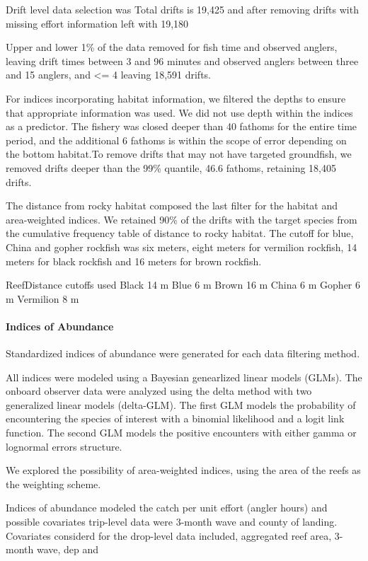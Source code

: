 \documentclass[preprint, 3p,
authoryear]{elsarticle} %
\begin{document}
Drift level data selection was Total drifts is 19,425 and after removing
drifts with missing effort information left with 19,180

Upper and lower 1\% of the data removed for fish time and observed
anglers, leaving drift times between 3 and 96 minutes and observed
anglers between three and 15 anglers, and \textless= 4 leaving 18,591
drifts.

For indices incorporating habitat information, we filtered the depths to
ensure that appropriate information was used. We did not use depth
within the indices as a predictor. The fishery was closed deeper than 40
fathoms for the entire time period, and the additional 6 fathoms is
within the scope of error depending on the bottom habitat.To remove
drifts that may not have targeted groundfish, we removed drifts deeper
than the 99\% quantile, 46.6 fathoms, retaining 18,405 drifts.

The distance from rocky habitat composed the last filter for the habitat
and area-weighted indices. We retained 90\% of the drifts with the
target species from the cumulative frequency table of distance to rocky
habitat. The cutoff for blue, China and gopher rockfish was six meters,
eight meters for vermilion rockfish, 14 meters for black rockfish and 16
meters for brown rockfish.

ReefDistance cutoffs used Black 14 m Blue 6 m Brown 16 m China 6 m
Gopher 6 m Vermilion 8 m

\hypertarget{indices-of-abundance}{%
\paragraph{Indices of Abundance}\label{indices-of-abundance}}

Standardized indices of abundance were generated for each data filtering
method.

All indices were modeled using a Bayesian genearlized linear models
(GLMs). The onboard observer data were analyzed using the delta method
with two generalized linear models (delta-GLM). The first GLM models the
probability of encountering the species of interest with a binomial
likelihood and a logit link function. The second GLM models the positive
encounters with either gamma or lognormal errors structure.

We explored the possibility of area-weighted indices, using the area of
the reefs as the weighting scheme.

Indices of abundance modeled the catch per unit effort (angler hours)
and possible covariates trip-level data were 3-month wave and county of
landing. Covariates considerd for the drop-level data included,
aggregated reef area, 3-month wave, dep and
\end{document}
